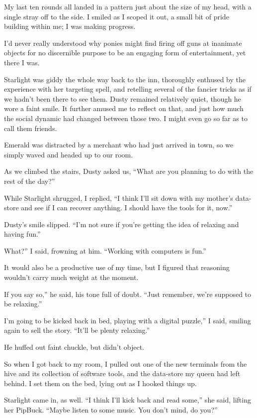 My last ten rounds all landed in a pattern just about the size of my head, with a single stray off to the side. I smiled as I scoped it out, a small bit of pride building within me; I was making progress.

I’d never really understood why ponies might find firing off guns at inanimate objects for no discernible purpose to be an engaging form of entertainment, yet there I was.

Starlight was giddy the whole way back to the inn, thoroughly enthused by the experience with her targeting spell, and retelling several of the fancier tricks as if we hadn’t been there to see them. Dusty remained relatively quiet, though he wore a faint smile. It further amused me to reflect on that, and just how much the social dynamic had changed between those two. I might even go so far as to call them friends.

Emerald was distracted by a merchant who had just arrived in town, so we simply waved and headed up to our room.

As we climbed the stairs, Dusty asked us, “What are you planning to do with the rest of the day?”

While Starlight shrugged, I replied, “I think I’ll sit down with my mother’s data-store and see if I can recover anything. I should have the tools for it, now.”

Dusty’s smile slipped. “I’m not sure if you’re getting the idea of relaxing and having fun.”

\leavevmode{}What?” I said, frowning at him. “Working with computers is fun.”

It would also be a productive use of my time, but I figured that reasoning wouldn’t carry much weight at the moment.

\leavevmode{}If you say so,” he said, his tone full of doubt. “Just remember, we’re supposed to be relaxing.”

\leavevmode{}I’m going to be kicked back in bed, playing with a digital puzzle,” I said, smiling again to sell the story. “It’ll be plenty relaxing.”

He huffed out faint chuckle, but didn’t object.

So when I got back to my room, I pulled out one of the new terminals from the hive and its collection of software tools, and the data-store my queen had left behind. I set them on the bed, lying out as I hooked things up.

Starlight came in, as well. “I think I’ll kick back and read some,” she said, lifting her PipBuck. “Maybe listen to some music. You don’t mind, do you?”


